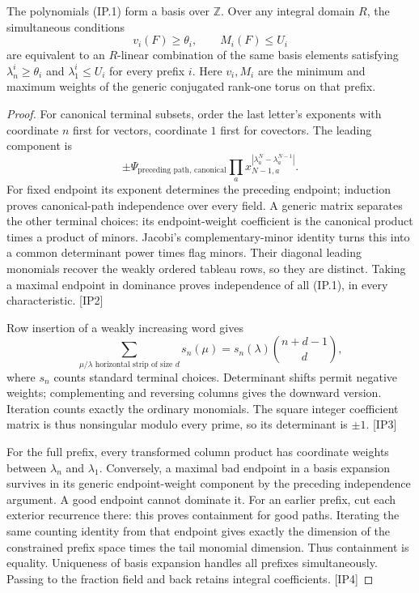 \begin{lemma}
The polynomials (IP.1) form a basis over $\mathbb Z$. Over any integral domain $R$, the simultaneous conditions
\[
 v_i(F)\ge\theta_i,\qquad M_i(F)\le U_i
 \tag{IP.2}
\]
are equivalent to an $R$-linear combination of the same basis elements satisfying $\lambda^i_n\ge\theta_i$ and $\lambda^i_1\le U_i$ for every prefix $i$. Here $v_i,M_i$ are the minimum and maximum weights of the generic conjugated rank-one torus on that prefix.
\end{lemma}
\begin{proof}
For canonical terminal subsets, order the last letter's exponents with coordinate $n$ first for vectors, coordinate $1$ first for covectors. The leading component is
\[
 \pm\Psi_{\text{preceding path, canonical}}
       \prod_a x_{N-1,a}^{|\lambda^N_a-\lambda^{N-1}_a|}.
\]
For fixed endpoint its exponent determines the preceding endpoint; induction proves canonical-path independence over every field. A generic matrix separates the other terminal choices: its endpoint-weight coefficient is the canonical product times a product of minors. Jacobi's complementary-minor identity turns this into a common determinant power times flag minors. Their diagonal leading monomials recover the weakly ordered tableau rows, so they are distinct. Taking a maximal endpoint in dominance proves independence of all (IP.1), in every characteristic. \textsf{[IP2]}

Row insertion of a weakly increasing word gives
\[
 \sum_{\mu/\lambda\text{ horizontal strip of size }d}s_n(\mu)
   =s_n(\lambda)\binom{n+d-1}{d},
\]
where $s_n$ counts standard terminal choices. Determinant shifts permit negative weights; complementing and reversing columns gives the downward version. Iteration counts exactly the ordinary monomials. The square integer coefficient matrix is thus nonsingular modulo every prime, so its determinant is $\pm1$. \textsf{[IP3]}

For the full prefix, every transformed column product has coordinate weights between $\lambda_n$ and $\lambda_1$. Conversely, a maximal bad endpoint in a basis expansion survives in its generic endpoint-weight component by the preceding independence argument. A good endpoint cannot dominate it. For an earlier prefix, cut each exterior recurrence there: this proves containment for good paths. Iterating the same counting identity from that endpoint gives exactly the dimension of the constrained prefix space times the tail monomial dimension. Thus containment is equality. Uniqueness of basis expansion handles all prefixes simultaneously. Passing to the fraction field and back retains integral coefficients. \textsf{[IP4]}
\end{proof}


